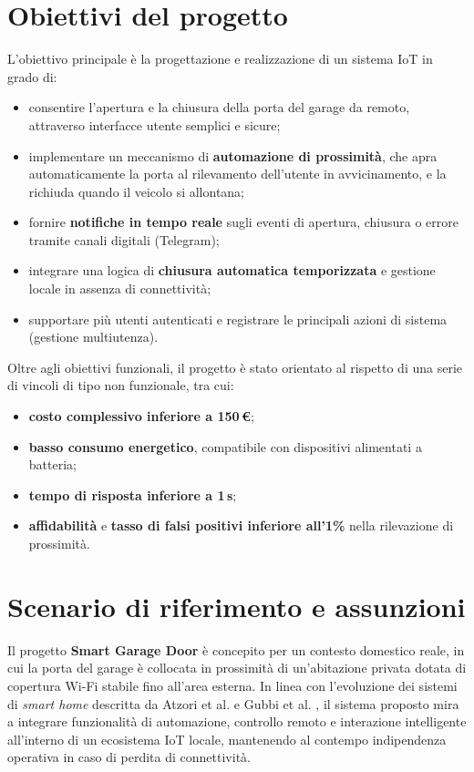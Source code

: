 \section{Obiettivi del progetto}
L’obiettivo principale è la progettazione e realizzazione di un sistema IoT in grado di:
\begin{itemize}
    \item consentire l’apertura e la chiusura della porta del garage da remoto, attraverso interfacce utente semplici e sicure;
    \item implementare un meccanismo di \textbf{automazione di prossimità}, che apra automaticamente la porta al rilevamento dell’utente in avvicinamento, e la richiuda quando il veicolo si allontana;
    \item fornire \textbf{notifiche in tempo reale} sugli eventi di apertura, chiusura o errore tramite canali digitali (Telegram);
    \item integrare una logica di \textbf{chiusura automatica temporizzata} e gestione locale in assenza di connettività;
    \item supportare più utenti autenticati e registrare le principali azioni di sistema (gestione multiutenza).
\end{itemize}

Oltre agli obiettivi funzionali, il progetto è stato orientato al rispetto di una serie di vincoli di tipo non funzionale, tra cui:
\begin{itemize}
    \item \textbf{costo complessivo inferiore a 150\,€};
    \item \textbf{basso consumo energetico}, compatibile con dispositivi alimentati a batteria;
    \item \textbf{tempo di risposta inferiore a 1\,s};
    \item \textbf{affidabilità} e \textbf{tasso di falsi positivi inferiore all’1\%} nella rilevazione di prossimità.
\end{itemize}

\section{Scenario di riferimento e assunzioni}

Il progetto \textbf{Smart Garage Door} è concepito per un contesto domestico reale, in cui la porta del garage è collocata in prossimità di un’abitazione privata dotata di copertura Wi-Fi stabile fino all’area esterna.  
In linea con l’evoluzione dei sistemi di \textit{smart home} descritta da Atzori et al. \cite{Atzori2010} e Gubbi et al. \cite{Gubbi2013}, il sistema proposto mira a integrare funzionalità di automazione, controllo remoto e interazione intelligente all’interno di un ecosistema IoT locale, mantenendo al contempo indipendenza operativa in caso di perdita di connettività.

